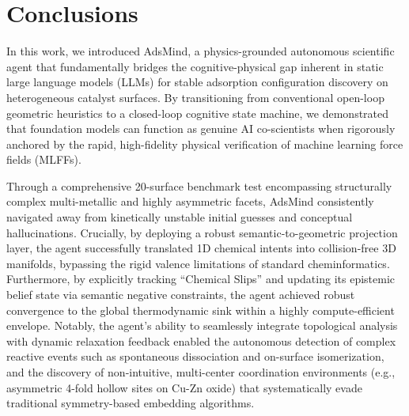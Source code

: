 \documentclass{article}
\begin{document}
\section{Conclusions}
In this work, we introduced AdsMind, a physics-grounded autonomous scientific agent that fundamentally bridges the cognitive-physical gap inherent in static large language models (LLMs) for stable adsorption configuration discovery on heterogeneous catalyst surfaces. By transitioning from conventional open-loop geometric heuristics to a closed-loop cognitive state machine, we demonstrated that foundation models can function as genuine AI co-scientists when rigorously anchored by the rapid, high-fidelity physical verification of machine learning force fields (MLFFs).

Through a comprehensive 20-surface benchmark test encompassing structurally complex multi-metallic and highly asymmetric facets, AdsMind consistently navigated away from kinetically unstable initial guesses and conceptual hallucinations. Crucially, by deploying a robust semantic-to-geometric projection layer, the agent successfully translated 1D chemical intents into collision-free 3D manifolds, bypassing the rigid valence limitations of standard cheminformatics. Furthermore, by explicitly tracking ``Chemical Slips'' and updating its epistemic belief state via semantic negative constraints, the agent achieved robust convergence to the global thermodynamic sink within a highly compute-efficient envelope. Notably, the agent's ability to seamlessly integrate topological analysis with dynamic relaxation feedback enabled the autonomous detection of complex reactive events such as spontaneous dissociation and on-surface isomerization, and the discovery of non-intuitive, multi-center coordination environments (e.g., asymmetric 4-fold hollow sites on Cu-Zn oxide) that systematically evade traditional symmetry-based embedding algorithms.
\end{document}
